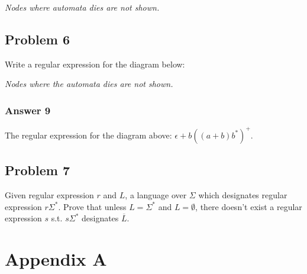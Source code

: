 \documentclass[11pt]{article}
\begin{document}
\emph{Nodes where automata dies are not shown.}

\subsection{Problem 6}
\label{sec:orgheadline17}
Write a regular expression for the diagram below:


\emph{Nodes where the automata dies are not shown.}

\subsubsection{Answer 9}
\label{sec:orgheadline16}
The regular expression for the diagram above: \(\epsilon + b((a + b)b^*)^+\).

\subsection{Problem 7}
\label{sec:orgheadline18}
Given regular expression \(r\) and \(L\), a language over \(\Sigma\) which
designates regular expression \(r\Sigma^*\).  Prove that unless \(L = \Sigma^*\)
and \(L = \emptyset\), there doesn't exist a regular expression \(s\) s.t.
\(s\Sigma^*\) designates \(\overline{L}\).
\section{Appendix A}
\label{sec:orgheadline11}
\bgroup

\egroup
\end{document}
